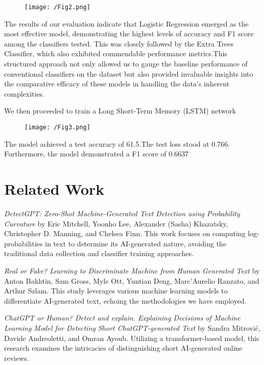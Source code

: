 \documentclass[11pt,a4paper]{article}
\begin{document}
\begin{figure}[htbp]
  \centering
  \texttt{[image: /Fig2.png]}
\end{figure}
The results of our evaluation indicate that Logistic Regression emerged as the most effective model, demonstrating the highest levels of accuracy and F1 score among the classifiers tested. This was closely followed by the Extra Trees Classifier, which also exhibited commendable performance metrics.This structured approach not only allowed us to gauge the baseline performance of conventional classifiers on the dataset but also provided invaluable insights into the comparative efficacy of these models in handling the data's inherent complexities. 

We then proceeded to train a Long Short-Term Memory (LSTM) network 

\begin{figure}[htbp]
  \centering
  \texttt{[image: /Fig3.png]}
\end{figure}

The model achieved a test accuracy of 61.5.The test loss stood at 0.766. Furthermore, the model demonstrated a F1 score of 0.6637 

\section{Related Work}

\textit{DetectGPT: Zero-Shot Machine-Generated Text Detection using Probability Curvature} by Eric Mitchell, Yoonho Lee, Alexander (Sasha) Khazatsky, Christopher D. Manning, and Chelsea Finn. This work focuses on computing log-probabilities in text to determine its AI-generated nature, avoiding the traditional data collection and classifier training approaches.

\textit{Real or Fake? Learning to Discriminate Machine from Human Generated Text} by Anton Bakhtin, Sam Gross, Myle Ott, Yuntian Deng, Marc'Aurelio Ranzato, and Arthur Szlam. This study leverages various machine learning models to differentiate AI-generated text, echoing the methodologies we have employed.

\textit{ChatGPT or Human? Detect and explain. Explaining Decisions of Machine Learning Model for Detecting Short ChatGPT-generated Text} by Sandra Mitrović, Davide Andreoletti, and Omran Ayoub. Utilizing a transformer-based model, this research examines the intricacies of distinguishing short AI-generated online reviews.
\end{document}
